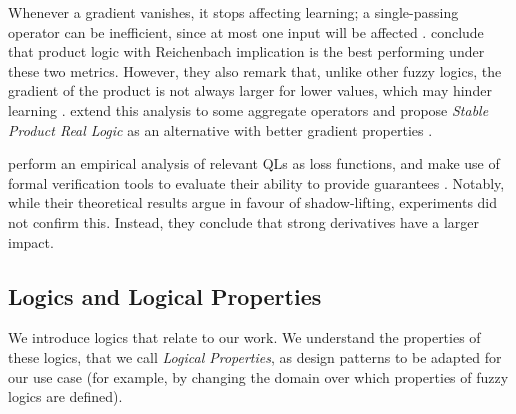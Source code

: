 Whenever a gradient vanishes, it stops affecting learning; a single-passing operator can be inefficient, since at most one input will be affected \citep{van2022analyzing}. \citeauthor{van2022analyzing} conclude that product logic with Reichenbach implication is the best performing under these two metrics. However, they also remark that, unlike other fuzzy logics, the gradient of the product is not always larger for lower values, which may hinder learning \citep{van2022analyzing}.  \citeauthor{badreddine2022logic} extend this analysis to some aggregate operators and propose \textit{Stable Product Real Logic} as an alternative with better gradient properties \citep{badreddine2022logic}. 

\citeauthor{FLINKOW2025103280} perform an empirical analysis of relevant QLs as loss functions, and make use of formal verification tools to evaluate their ability to provide guarantees \citep{FLINKOW2025103280}. Notably, while their theoretical results argue in favour of shadow-lifting, experiments did not confirm this. Instead, they conclude that strong derivatives have a larger impact.

\begin{comment}
\begin{definition}[Exploding]
     A function $f : \real \rightarrow \real$ is said to be \textit{exploding} if there are $a,b \in \real, a < b$ such that for all $c \in (a,b)$ when $x \longrightarrow c$ then $f(x) \longrightarrow \infty$. Otherwise, the function is \textit{nonexploding}. A function $f : \real^n \rightarrow \real$ has an \textit{exploding gradient} if there is some $i \in [0,n]$ such that $\dfrac{\partial f(x_1,\dots,x_n)}{\partial x_i}$ is exploding.
\end{definition}    
\end{comment}



\subsection{Logics and Logical Properties}

We introduce logics that relate to our work. We understand the properties of these logics, that we call \textit{Logical Properties}, as design patterns to be adapted for our use case (for example, by changing the domain over which properties of fuzzy logics are defined). 

